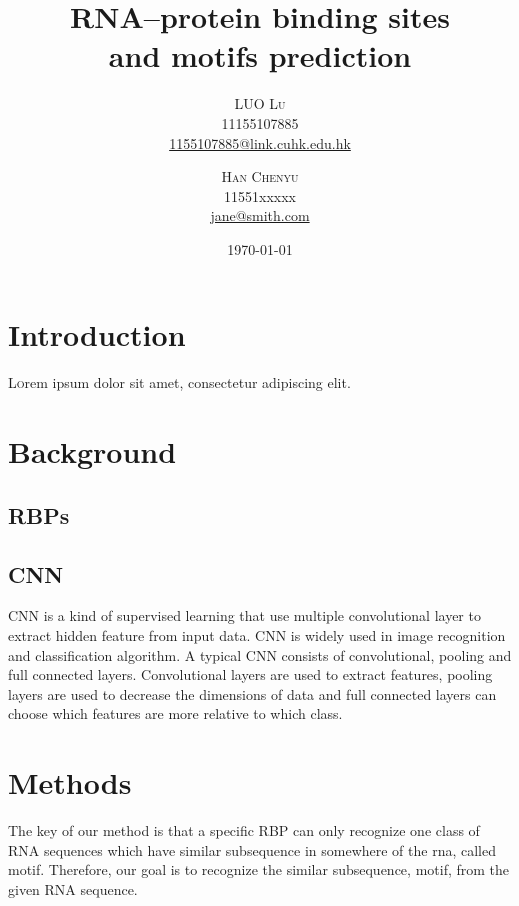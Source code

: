 \documentclass[twoside,twocolumn]{article}
\title{RNA–protein binding sites \\ and motifs prediction} %
\author{%
\textsc{LUO Lu} \\[1ex] %
\normalsize 11155107885 \\ %
\normalsize \href{mailto:1155107885@link.cuhk.edu.hk}{1155107885@link.cuhk.edu.hk}
\and
\textsc{Han Chenyu}\\[1ex] %
\normalsize 11551xxxxx \\ %
\normalsize \href{mailto:jane@smith.com}{jane@smith.com} %
}
\date{\today} %
\begin{document}
\maketitle


\section{Introduction}

\lettrine[nindent=0em,lines=3]{L} orem ipsum dolor sit amet, consectetur adipiscing elit.
\blindtext %

\blindtext %


\section{Background}
    \subsection{RBPs}
    \subsection{CNN}
    
    CNN is a kind of supervised learning that use multiple convolutional layer to extract hidden feature from input data. CNN is widely used in image recognition and classification algorithm. A typical CNN consists of convolutional, pooling and full connected layers. Convolutional layers are used to extract features, pooling layers are used to decrease the dimensions of data and full connected layers can choose which features are more relative to which class.
    
\section{Methods}

The key of our method is that a specific RBP can only recognize one class of RNA sequences which have similar subsequence in somewhere of the rna, called motif. Therefore, our goal is to recognize the similar subsequence, motif, from the given RNA sequence. 
\end{document}
